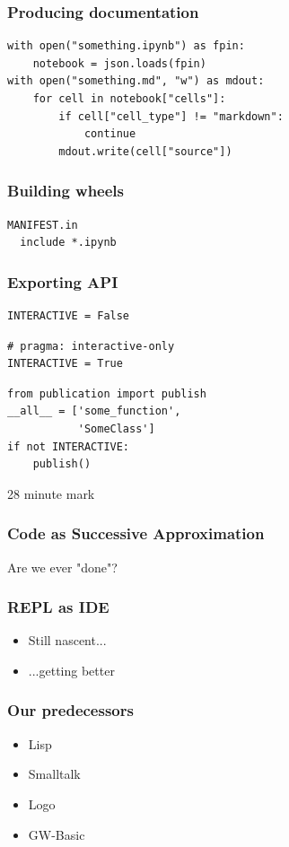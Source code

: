 \begin{frame}[fragile]
\frametitle{Producing documentation}

\begin{lstlisting}
with open("something.ipynb") as fpin:
    notebook = json.loads(fpin)
with open("something.md", "w") as mdout:
    for cell in notebook["cells"]:
        if cell["cell_type"] != "markdown":
            continue
        mdout.write(cell["source"])
\end{lstlisting}

\end{frame}


\begin{frame}[fragile]
\frametitle{Building wheels}

\begin{lstlisting}
MANIFEST.in
  include *.ipynb
\end{lstlisting}

\end{frame}

\begin{frame}[fragile]
\frametitle{Exporting API}

\begin{lstlisting}[frame=single]
INTERACTIVE = False
\end{lstlisting}

\begin{lstlisting}[frame=single]
# pragma: interactive-only 
INTERACTIVE = True
\end{lstlisting}

\begin{lstlisting}[frame=single]
from publication import publish
__all__ = ['some_function',
           'SomeClass']
if not INTERACTIVE:
    publish()
\end{lstlisting}

\end{frame}

28 minute mark

\begin{frame}
\frametitle{Code as Successive Approximation}

Are we ever "done"?

\end{frame}

\begin{frame}
\frametitle{REPL as IDE}

\begin{itemize}
\item Still nascent...
\item ...getting better
\end{itemize}

\end{frame}

\begin{frame}
\frametitle{Our predecessors}

\begin{itemize}
\item Lisp
\item Smalltalk
\item Logo
\item GW-Basic
\end{itemize}

\end{frame}


